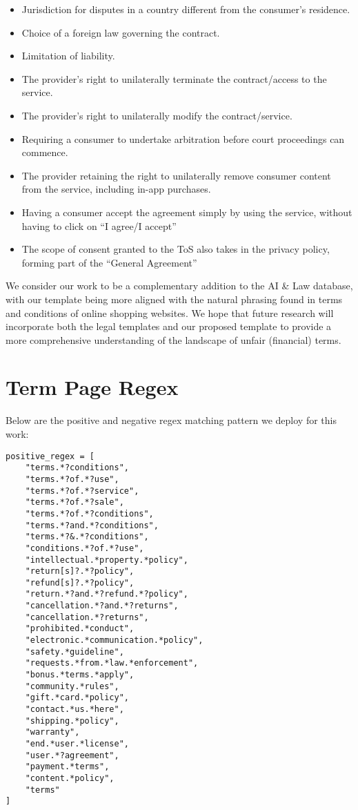 \begin{itemize}
    \item Jurisdiction for disputes in a country different from the consumer’s residence.
    \item Choice of a foreign law governing the contract.
    \item Limitation of liability.
    \item The provider’s right to unilaterally terminate the contract/access to the service.
    \item The provider’s right to unilaterally modify the contract/service.
    \item Requiring a consumer to undertake arbitration before court proceedings can commence.
    \item The provider retaining the right to unilaterally remove consumer content from the service, including in-app purchases.
    \item Having a consumer accept the agreement simply by using the service, without having to click on “I agree/I accept”
    \item The scope of consent granted to the ToS also takes in the privacy policy, forming part of the “General Agreement”
\end{itemize}

We consider our work to be a complementary addition to the AI \& Law database, with our template being more aligned with the natural phrasing found in terms and conditions of online shopping websites. We hope that future research will incorporate both the legal templates and our proposed template to provide a more comprehensive understanding of the landscape of unfair (financial) terms.




\section{Term Page Regex}
\label{sec:appendix_reg}

Below are the positive and negative regex matching pattern we deploy for this work:

\begin{lstlisting}[label=Positive]
positive_regex = [
    "terms.*?conditions",
    "terms.*?of.*?use",
    "terms.*?of.*?service",
    "terms.*?of.*?sale",
    "terms.*?of.*?conditions",
    "terms.*?and.*?conditions",
    "terms.*?&.*?conditions",
    "conditions.*?of.*?use",
    "intellectual.*property.*policy",
    "return[s]?.*?policy",
    "refund[s]?.*?policy",
    "return.*?and.*?refund.*?policy",
    "cancellation.*?and.*?returns",
    "cancellation.*?returns",
    "prohibited.*conduct",
    "electronic.*communication.*policy",
    "safety.*guideline",
    "requests.*from.*law.*enforcement",
    "bonus.*terms.*apply",
    "community.*rules",
    "gift.*card.*policy",
    "contact.*us.*here",
    "shipping.*policy",
    "warranty",
    "end.*user.*license",
    "user.*?agreement",
    "payment.*terms",
    "content.*policy",
    "terms"
]

\end{lstlisting}

